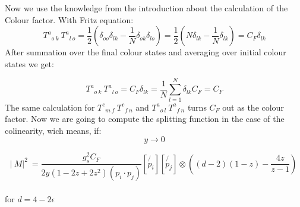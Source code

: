 Now we use the knowledge from the introduction about the calculation of the Colour factor. With Fritz equation:
\begin{equation}
{T^a}_{o\:k} \: {T^a}_{l\:o} = \frac{1}{2}(\delta_{oo}\delta_{lk}-\frac{1}{N}\delta_{ok}\delta_{lo})= \frac{1}{2}(N\delta_{lk}-\frac{1}{N}\delta_{lk})=C_F \delta_{lk}
\end{equation}
After summation over the final colour states and averaging over initial colour states we get:

\begin{equation}
{T^a}_{o\:k} \: {T^a}_{l\:o}=C_F \delta_{lk}=\frac{1}{N} \displaystyle\sum\limits_{l=1}^ N \delta_{lk}C_F=C_F
\end{equation}
The same calculation for $ {T^c}_{m\:f} \: {T^c}_{f\:n} $ and $ {T^a}_{o\:l} \: {T^a}_{f\:n} $ turns $ C_F $ out as the colour factor.
Now we are going to compute the splitting function in the case of the colinearity, wich means, if:
\begin{equation}
y \longrightarrow 0
\end{equation}


\begin{equation}
\lvert\:M\lvert^2\: = \frac{g_s^2 C_F}{2y(1-2z+2z^2)(p_i \cdot p_j)}[\not{p_i}][\not{p_j}] \otimes((d-2)(1-z)-\frac{4z}{z-1})\:
\end{equation}
\\
for $ d=4-2\epsilon $


